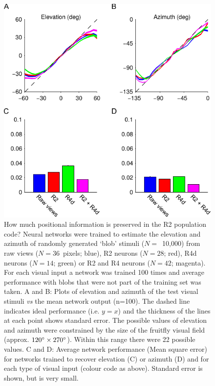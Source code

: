 \begin{figure}
\centering
\includegraphics{figures/elaz}
\caption{How much positional information is preserved in the R2 population code?
Neural networks were trained to estimate the elevation and azimuth of randomly generated `blob' stimuli ($N=$~10,000)  from raw views ($N=36$~pixels; blue), R2 neurons ($N=28$; red), R4d neurons ($N=14$; green) or R2 and R4 neurons ($N=42$; magenta). For each visual input a network was trained 100 times and average performance with blobs that were not part of the training set was taken.
A and B: Plots of elevation and azimuth of the test visual stimuli \emph{vs} the mean network output (n=100). The dashed line indicates ideal performance (i.e. $y=x$) and the thickness of the lines at each point shows standard error.
The possible values of elevation and azimuth were constrained by the size of the fruitfly visual field (approx. $120\degree \times 270\degree$). Within this range there were 22 possible values.
C and D: Average network performance (Mean square error) for networks trained to recover elevation (C) or azimuth (D) and for each type of visual input (colour code as above). Standard error is shown, but is very small.
}
\label{fig:elaz}
\end{figure}
